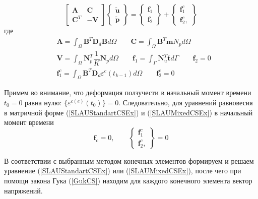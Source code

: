 \documentclass[a4paper,14pt]{extarticle}
\begin{document}
\begin{equation}\label{SLAUMixedCSEx}
\begin{bmatrix}
\mathbf{A} & \mathbf{C} \\
\mathbf{C}^{T} & -\mathbf{V} 
\end{bmatrix}
\begin{Bmatrix}
\tilde{\mathbf{u}} \\
\tilde{\mathbf{p}} 
\end{Bmatrix}
=
\begin{Bmatrix}
\mathbf{f}_1 \\
\mathbf{f}_2
\end{Bmatrix}
+
\begin{Bmatrix}
\mathbf{f}_1^{c} \\
\mathbf{f}_2^{c},
\end{Bmatrix}
\end{equation}
где 
\begin{equation*}
\begin{split}
&\mathbf{A}=\int_{\Omega} {\mathbf{B}^{T} \mathbf{D}_{d} \mathbf{B} d\Omega} \qquad \mathbf{C}=\int_{\Omega} {\mathbf{B}^{T} \mathbf{m} N_{p} d\Omega} \\
&\mathbf{V}=\int_{\Omega} {\mathbf{N}_{p}^{T} \dfrac{1}{K} \mathbf{N}_{p} d\Omega} \qquad \mathbf{f}_1=\int_{\Gamma} {\mathbf{N}_{u}^{T} \bar{\mathbf{t}}d\Gamma} \qquad \mathbf{f}_2=0 \\
& \mathbf{f}_1^{c}=\int_{\Omega} {\mathbf{B}^{T} \mathbf{D}_{d} {\varepsilon^{c}(t_{k-1})} d\Omega} \qquad \mathbf{f}_2^{c}=0
\end{split}
\end{equation*}

\newpage
Примем во внимание, что деформация ползучести в начальный момент времени $t_0=0$ равна нулю: $\{\varepsilon^{c(e)}(t_0)\}=0$. Следовательно, для уравнений равновесия в матричной форме (\ref{SLAUStandartCSEx}) и (\ref{SLAUMixedCSEx}) в начальный момент времени
\begin{equation*}
\textbf{f}_c=0, \qquad 
\begin{Bmatrix}
\mathbf{f}_1^{c} \\
\mathbf{f}_2^{c},
\end{Bmatrix}
=0
\end{equation*}

В соответствии с выбранным методом конечных элементов формируем и решаем уравнение (\ref{SLAUStandartCSEx}) или (\ref{SLAUMixedCSEx}), после чего при помощи закона Гука (\ref{GukCS}) находим для каждого конечного элемента вектор напряжений. 
\end{document}
